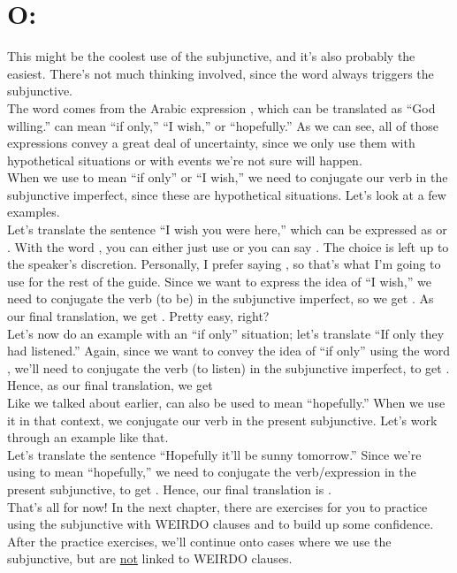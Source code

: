 \section{O: }

This might be the coolest use of the subjunctive, and it's also probably the easiest. There's not much thinking involved, since the word  always triggers the subjunctive. \\

The word  comes from the Arabic expression , which can be translated as ``God willing.''  can mean ``if only,'' ``I wish,'' or ``hopefully.'' As we can see, all of those expressions convey a great deal of uncertainty, since we only use them with hypothetical situations or with events we're not sure will happen.\\

When we use  to mean ``if only'' or ``I wish,'' we need to conjugate our verb in the subjunctive imperfect, since these are hypothetical situations. Let's look at a few examples. \\

Let's translate the sentence ``I wish you were here,'' which can be expressed as  or . With the word , you can either just use  or you can say . The choice is left up to the speaker's discretion. Personally, I prefer saying , so that's what I'm going to use for the rest of the guide. Since we want to express the idea of ``I wish,'' we need to conjugate the verb  (to be) in the subjunctive imperfect, so we get . As our final translation, we get . Pretty easy, right? \\

Let's now do an example with an ``if only'' situation; let's translate ``If only they had listened.'' Again, since we want to convey the idea of ``if only'' using the word , we'll need to conjugate the verb  (to listen) in the subjunctive imperfect, to get . Hence, as our final translation, we get  \\

Like we talked about earlier,  can also be used to mean ``hopefully.'' When we use it in that context, we conjugate our verb in the present subjunctive. Let's work through an example like that. \\

Let's translate the sentence ``Hopefully it'll be sunny tomorrow.'' Since we're using  to mean ``hopefully,'' we need to conjugate the verb/expression  in the present subjunctive, to get . Hence, our final translation is .\\

That's all for now! In the next chapter, there are exercises for you to practice using the subjunctive with WEIRDO clauses and to build up some confidence. After the practice exercises, we'll continue onto cases where we use the subjunctive, but are \underline{not} linked to WEIRDO clauses. 
